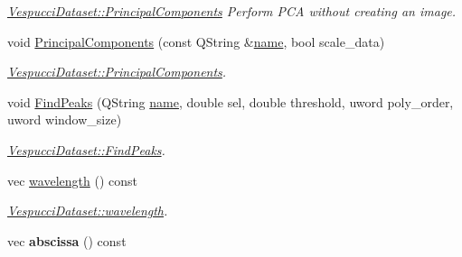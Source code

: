 \begin{DoxyCompactItemize}
\begin{DoxyCompactList}\small\item\em \hyperlink{class_vespucci_dataset_afda2b2b227ccea9e472b5cdfea305231}{Vespucci\+Dataset\+::\+Principal\+Components} Perform P\+CA without creating an image. \end{DoxyCompactList}\item 
void \hyperlink{class_vespucci_dataset_aca470a2d8d39ace95ea00bf4adb63f6d}{Principal\+Components} (const Q\+String \&\hyperlink{class_vespucci_dataset_a345a51b60127316b41caf92dc88fd792}{name}, bool scale\+\_\+data)
\begin{DoxyCompactList}\small\item\em \hyperlink{class_vespucci_dataset_afda2b2b227ccea9e472b5cdfea305231}{Vespucci\+Dataset\+::\+Principal\+Components}. \end{DoxyCompactList}\item 
void \hyperlink{class_vespucci_dataset_ae8189f05765b99d879ddff922c0a1d53}{Find\+Peaks} (Q\+String \hyperlink{class_vespucci_dataset_a345a51b60127316b41caf92dc88fd792}{name}, double sel, double threshold, uword poly\+\_\+order, uword window\+\_\+size)
\begin{DoxyCompactList}\small\item\em \hyperlink{class_vespucci_dataset_ae8189f05765b99d879ddff922c0a1d53}{Vespucci\+Dataset\+::\+Find\+Peaks}. \end{DoxyCompactList}\item 
vec \hyperlink{class_vespucci_dataset_ad2ea4fcac54bae36565fde6c95177eee}{wavelength} () const 
\begin{DoxyCompactList}\small\item\em \hyperlink{class_vespucci_dataset_ad2ea4fcac54bae36565fde6c95177eee}{Vespucci\+Dataset\+::wavelength}. \end{DoxyCompactList}\item 
vec {\bfseries abscissa} () const \hypertarget{class_vespucci_dataset_a2c1fc2146dc00c5d40e2ba28c59bb493}{}\label{class_vespucci_dataset_a2c1fc2146dc00c5d40e2ba28c59bb493}


\end{DoxyCompactItemize}
